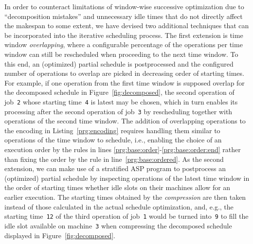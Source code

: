 \documentclass{tlp} %
\begin{document}
In order to counteract limitations of window-wise successive optimization
due to ``decomposition mistakes'' and unnecessary idle times that do not directly
affect the makespan to some extent,
we have devised two additional techniques that can be incorporated into the
iterative scheduling process.
The first extension is time window \emph{overlapping}, where a configurable percentage
of the operations per time window can still be rescheduled when proceeding
to the next time window.
To this end, an (optimized) partial schedule is postprocessed and the configured
number of operations to overlap are picked in decreasing order of starting times.
For example, if one operation from the first time window is supposed overlap for the
decomposed schedule in Figure~\ref{fig:decomposed}, the second operation of job~\lstinline{2}
whose starting time~\lstinline{4} is latest may be chosen,
which in turn enables its processing after the second operation of job~\lstinline{3}
by rescheduling together with operations of the second time window.
The addition of overlapping operations to the encoding in Listing~\ref{prg:encoding}
requires handling them similar to operations of the time window to schedule,
i.e., enabling the choice of an execution order by the rules in lines
\ref{prg:base:order}-\ref{prg:base:order:end} rather than fixing the order
by the rule in line~\ref{prg:base:ordered}.
As the second extension, we can make use of a stratified ASP program to
postprocess an (optimized) partial schedule by inspecting operations of the
latest time window in the order of starting times whether idle slots
on their machines allow for an earlier execution.
The starting times obtained by the \emph{compression} are then taken instead
of those calculated in the actual schedule optimization, and, e.g.,
the starting time~\lstinline{12} of the third operation of job~\lstinline{1}
would be turned into~\lstinline{9} to fill the idle slot available on
machine~\lstinline{3} when compressing the decomposed schedule displayed in Figure~\ref{fig:decomposed}.
\end{document}

